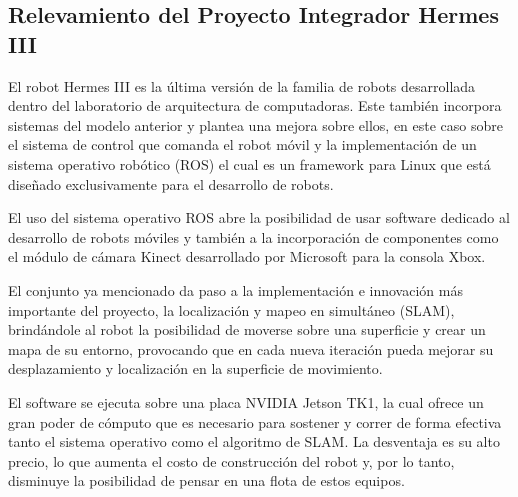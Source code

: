 \subsection{Relevamiento del Proyecto Integrador Hermes III}

El robot Hermes III es la última versión de la familia de robots desarrollada dentro del laboratorio de arquitectura de computadoras. Este también incorpora sistemas del modelo anterior y plantea una mejora sobre ellos, en este caso sobre el sistema de control que comanda el robot móvil y la implementación de un sistema operativo robótico (ROS) el cual es un framework para Linux que está diseñado exclusivamente para el desarrollo de robots. \cite{micolini2022hermes}

El uso del sistema operativo ROS abre la posibilidad de usar software dedicado al desarrollo de robots móviles y también a la incorporación de componentes como el módulo de cámara Kinect desarrollado por Microsoft para la consola Xbox.

El conjunto ya mencionado da paso a la implementación e innovación más importante del proyecto, la localización y mapeo en simultáneo (SLAM), brindándole al robot la posibilidad de moverse sobre una superficie y crear un mapa de su entorno, provocando que en cada nueva iteración pueda mejorar su desplazamiento y localización en la superficie de movimiento.

El software se ejecuta sobre una placa NVIDIA Jetson TK1, la cual ofrece un gran poder de cómputo que es necesario para sostener y correr de forma efectiva tanto el sistema operativo como el algoritmo de SLAM. La desventaja es su alto precio, lo que aumenta el costo de construcción del robot y, por lo tanto, disminuye la posibilidad de pensar en una flota de estos equipos.